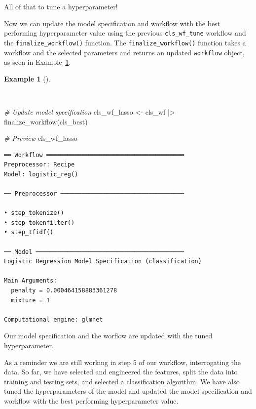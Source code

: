\documentclass[
  letterpaper,
  krantz1]{latex/krantz-mod}
\newenvironment{Shaded}{\begin{snugshade}}{\end{snugshade}}
\newcommand{\CommentTok}[1]{\textcolor[rgb]{0.00,0.00,0.00}{\textit{#1}}}
\newcommand{\FunctionTok}[1]{\textcolor[rgb]{0.00,0.00,0.00}{#1}}
\newcommand{\NormalTok}[1]{\textcolor[rgb]{0.00,0.00,0.00}{#1}}
\newcommand{\OtherTok}[1]{\textcolor[rgb]{0.00,0.00,0.00}{#1}}
\newcommand{\SpecialCharTok}[1]{\textcolor[rgb]{0.00,0.00,0.00}{#1}}
\theoremstyle{definition}
\newtheorem{example}{Example}[chapter]
\theoremstyle{definition}
\theoremstyle{remark}
\begin{document}
All of that to tune a hyperparameter!

Now we can update the model specification and workflow with the best
performing hyperparameter value using the previous
\texttt{cls\_wf\_tune} workflow and the \texttt{finalize\_workflow()}
function. The \texttt{finalize\_workflow()} function takes a workflow
and the selected parameters and returns an updated \texttt{workflow}
object, as seen in
Example~\ref{exm-predict-class-tune-hyperparameters-update-workflow}.

\begin{example}[]\protect\hypertarget{exm-predict-class-tune-hyperparameters-update-workflow}{}\label{exm-predict-class-tune-hyperparameters-update-workflow}

~

\begin{Shaded}
\begin{Highlighting}[numbers=left,,]
\CommentTok{\# Update model specification}
\NormalTok{cls\_wf\_lasso }\OtherTok{\textless{}{-}}
\NormalTok{  cls\_wf }\SpecialCharTok{|\textgreater{}}
  \FunctionTok{finalize\_workflow}\NormalTok{(cls\_best)}

\CommentTok{\# Preview}
\NormalTok{cls\_wf\_lasso}
\end{Highlighting}
\end{Shaded}

\begin{verbatim}
══ Workflow ═══════════════════════════════════════
Preprocessor: Recipe
Model: logistic_reg()

── Preprocessor ───────────────────────────────────

• step_tokenize()
• step_tokenfilter()
• step_tfidf()

── Model ──────────────────────────────────────────
Logistic Regression Model Specification (classification)

Main Arguments:
  penalty = 0.000464158883361278
  mixture = 1

Computational engine: glmnet
\end{verbatim}

\end{example}

Our model specification and the worflow are updated with the tuned
hyperparameter.

As a reminder we are still working in step 5 of our workflow,
interrogating the data. So far, we have selected and engineered the
features, split the data into training and testing sets, and selected a
classification algorithm. We have also tuned the hyperparameters of the
model and updated the model specification and workflow with the best
performing hyperparameter value.
\end{document}
